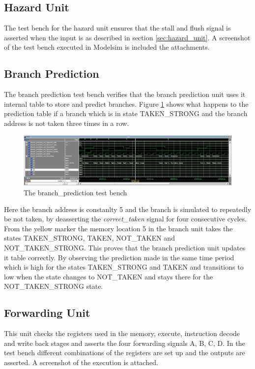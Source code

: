 \subsection{Hazard Unit}

The test bench for the hazard unit ensures that the stall and flush signal is asserted when the input is as described in section \ref{sec:hazard_unit}. A screenshot of the test bench executed in Modelsim is included the attachments.


\subsection{Branch Prediction}

The branch prediction test bench verifies that the branch prediction unit uses it internal table to store and predict branches. Figure \ref{fig:branch_prediction_tb} shows what happens to the prediction table if a branch which is in state TAKEN\_STRONG and the branch address is not taken three times in a row.

\begin{figure}[h]
        \centerline{\includegraphics[width=600px]{figures/tb/branch_prediction.jpg}}
        \caption{The branch\_prediction test bench}
        \label{fig:branch_prediction_tb}
\end{figure}
\FloatBarrier

Here the branch address is constanlty 5 and the branch is simulated to repeatedly be not taken, by deasserting the \emph{correct\_taken} signal for four consecutive cycles. From the yellow marker the memory location 5 in the branch unit takes the states TAKEN\_STRONG, TAKEN, NOT\_TAKEN and NOT\_TAKEN\_STRONG. This proves that the branch prediction unit updates it table correctly. By observing the prediction made in the same time period which is high for the states TAKEN\_STRONG and TAKEN and transitions to low when the state changes to NOT\_TAKEN and stays there for the NOT\_TAKEN\_STRONG state.

\subsection{Forwarding Unit} 

This unit checks the registers used in the memory, execute, instruction decode and write back stages and asserts the four forwarding signals A, B, C, D. In the test bench different combinations of the registers are set up and the outputs are asserted. A screenshot of the execution is attached.